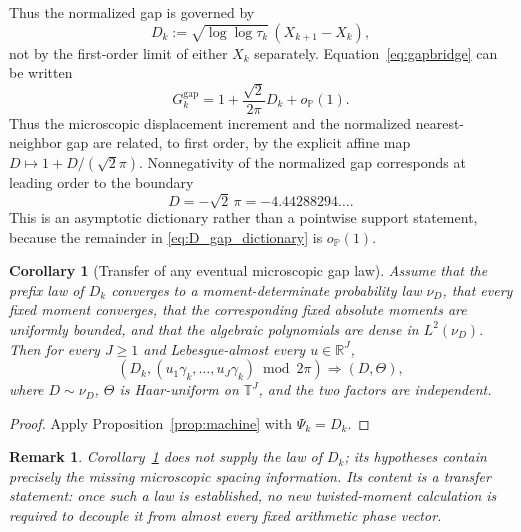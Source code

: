 \documentclass[pdflatex,sn-mathphys-num]{sn-jnl}
\numberwithin{equation}{section}
\theoremstyle{thmstyleone}
\newtheorem{corollary}[theorem]{Corollary}
\theoremstyle{thmstylethree}
\theoremstyle{thmstyletwo}
\newtheorem{remark}[theorem]{Remark}
\newcommand{\R}{\mathbb R}
\newcommand{\Torus}{\mathbb T}
\newcommand{\1}{\mathbf 1}
\newcommand{\Prob}{\mathbb P}
\begin{document}
Thus the normalized gap is governed by
\begin{equation}
 D_k:=\sqrt{\log\log\tau_k}\,(X_{k+1}-X_k),
\label{eq:Dcanonical}
\end{equation}
not by the first-order limit of either $X_k$ separately.  Equation~\eqref{eq:gapbridge} can be written
\begin{equation}
 G_k^{\mathrm{gap}}
 =
 1+\frac{\sqrt2}{2\pi}D_k+o_{\Prob}(1).
\label{eq:D_gap_dictionary}
\end{equation}
Thus the microscopic displacement increment and the normalized
nearest-neighbor gap are related, to first order, by the explicit affine map
\(D\mapsto 1+D/(\sqrt2\pi)\).  Nonnegativity of the normalized gap corresponds
at leading order to the boundary
\[
 D=-\sqrt2\,\pi=-4.44288294\ldots.
\]
This is an asymptotic dictionary rather than a pointwise support statement,
because the remainder in \eqref{eq:D_gap_dictionary} is \(o_{\Prob}(1)\).

\begin{corollary}[Transfer of any eventual microscopic gap law]
\label{cor:D_machine}
Assume that the prefix law of \(D_k\) converges to a moment-determinate
probability law \(\nu_D\), that every fixed moment converges, that the
corresponding fixed absolute moments are uniformly bounded, and that the
algebraic polynomials are dense in \(L^2(\nu_D)\).  Then for every $J\ge1$ and Lebesgue-almost every $u\in\R^J$,
\begin{equation}
 \left(
 D_k,
 (u_1\gamma_k,\ldots,u_J\gamma_k)\bmod2\pi
 \right)
 \Longrightarrow
 (D,\Theta),
\label{eq:D_phase_decoupling}
\end{equation}
where $D\sim\nu_D$, $\Theta$ is Haar-uniform on $\Torus^J$, and the two factors are independent.
\end{corollary}

\begin{proof}
Apply Proposition~\ref{prop:machine} with $\Psi_k=D_k$.
\end{proof}

\begin{remark}
Corollary~\ref{cor:D_machine} does not supply the law of $D_k$; its hypotheses contain precisely
the missing microscopic spacing information.  Its content is a transfer statement: once such a
law is established, no new twisted-moment calculation is required to decouple it from almost every
fixed arithmetic phase vector.
\end{remark}
\end{document}
